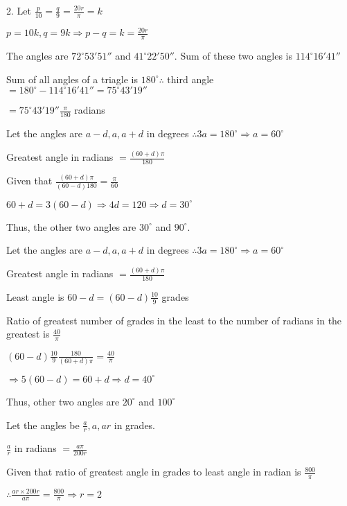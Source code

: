     2. Let $\frac{p}{10} = \frac{q}{9} = \frac{20r}{\pi} = k$

       $p = 10k, q = 9k \Rightarrow p - q = k = \frac{20r}{\pi}$

\item The angles are $72^{\circ}53'51''$ and $41^\circ22'50''.$ Sum of these two angles is $114^\circ16'41''$

    Sum of all angles of a triagle is $180^\circ \therefore$ third angle $= 180^\circ - 114^\circ16'41'' =
    75^\circ43'19''$

    $= 75^\circ43'19'' \frac{\pi}{180}$ radians

\item Let the angles are $a - d, a, a + d$ in degrees $\therefore 3a = 180^\circ \Rightarrow a = 60^\circ$

    Greatest angle in radians $= \frac{(60 + d)\pi}{180}$

    Given that $\frac{(60 + d)\pi}{(60 - d)180} = \frac{\pi}{60}$

    $60 + d = 3(60 - d) \Rightarrow 4d = 120 \Rightarrow d = 30^\circ$

    Thus, the other two angles are $30^\circ$ and $90^\circ.$

\item Let the angles are $a - d, a, a + d$ in degrees $\therefore 3a = 180^\circ \Rightarrow a = 60^\circ$

    Greatest angle in radians $= \frac{(60 + d)\pi}{180}$

    Least angle is $60 - d = (60 - d)\frac{10}{9}$ grades

    Ratio of greatest number of grades in the least to the number of radians in the greatest is $\frac{40}{\pi}$

    $(60 - d)\frac{10}{9}\frac{180}{(60 + d)\pi} = \frac{40}{\pi}$

    $\Rightarrow 5(60 - d) = 60 + d \Rightarrow d = 40^\circ$

    Thus, other two angles are $20^\circ$ and $100^\circ$

\item Let the angles be $\frac{a}{r}, a, ar$ in grades.

    $\frac{a}{r}$ in radians $=\frac{a\pi}{200r}$

    Given that ratio of greatest angle in grades to least angle in radian is $\frac{800}{\pi}$

    $\therefore \frac{ar\times 200r}{a\pi} = \frac{800}{\pi} \Rightarrow r = 2$

